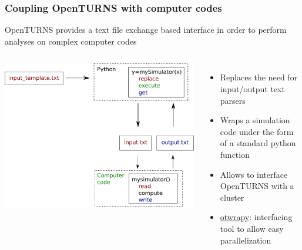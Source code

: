 \documentclass{beamer}
\begin{document}
\begin{frame}[containsverbatim]
  \frametitle{Coupling OpenTURNS with computer codes}
  
  \small
  
  OpenTURNS provides a text file exchange based interface in order to perform analyses on complex computer codes
  
  \vspace{10pt}
  
  \begin{columns}
      
  \centering
  
  \includegraphics[width=1.\textwidth]{figures/Coupling.pdf}
  
  
  \begin{itemize}
  \item Replaces the need for input/output text parsers
  \item Wraps a simulation code under the form of a standard python function
  \item Allows to interface OpenTURNS with a cluster
  \item \href{https://openturns.github.io/otwrapy/master/index.html}{otwrapy}: interfacing tool to allow easy parallelization
  \end{itemize}
  
  \end{columns}
  
\end{frame}
\end{document}
